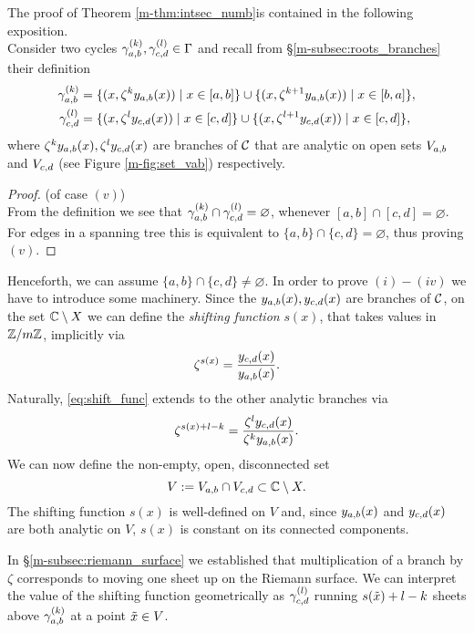 \documentclass[main.tex]{subfiles}
\begin{document}
 \bigskip
 The proof of Theorem \ref{m-thm:intsec_numb}is contained in the following exposition. \\ 
  Consider
  two cycles $\gamma_{a,b}^{(k)},\gamma_{c,d}^{(l)} \in \Gamma$ and
  recall from \S \ref{m-subsec:roots_branches} their definition 
   \begin{align*}
      \gamma_{a,b}^{(k)} & = \{  (x,\zeta^k y_{a,b}(x))  \mid  x \in [a,b]  \} \cup \{  (x,\zeta^{k+1} y_{a,b}(x))  \mid  x \in [b,a]  \}, \\
      \gamma_{c,d}^{(l)} & = \{  (x,\zeta^l y_{c,d}(x))  \mid  x \in [c,d]  \} \cup \{  (x,\zeta^{l+1} y_{c,d}(x))  \mid  x \in [c,d]  \},
   \end{align*}
  where $\zeta^ky_{a,b}(x),\zeta^ly_{c,d}(x)$ are branches of $\mathcal{C}$ that are analytic on open sets $V_{a,b}$ and $V_{c,d}$ 
  (see Figure \ref{m-fig:set_vab}) respectively.
  \begin{proof}\let\qed\relax (of case $(v)$) \\
  From the definition we see that $\gamma_{a,b}^{(k)} \cap \gamma_{c,d}^{(l)} = \varnothing$, whenever $[a,b] \cap [c,d] = \varnothing$. For edges in a spanning tree
  this is equivalent to $\{a,b\} \cap \{c,d\} = \varnothing$, thus
  proving $(v)$.
  \end{proof}
   Henceforth, we can assume $\{a,b\} \cap \{c,d\} \ne \varnothing$. In order to prove $(i)-(iv)$ we have to introduce some machinery. Since the $y_{a,b}(x),y_{c,d}(x)$ are branches of $\mathcal{C}$,
   on the set $\mathbb{C} \setminus X$
   we can define the \emph{shifting function}
   $s(x)$, that takes values in $\mathbb{Z}/m\mathbb{Z}$, implicitly via
  \begin{equation}\label{eq:shift_func}
   \zeta^{s(x)} = \frac{y_{c,d}(x)}{y_{a,b}(x)}.
   \end{equation}
  Naturally, \eqref{eq:shift_func} extends to the other analytic branches via
  \begin{equation*}
   \zeta^{s(x)+l-k} = \frac{\zeta^ly_{c,d}(x)}{\zeta^ky_{a,b}(x)}.
   \end{equation*}
   We can now define the non-empty, open, disconnected set
   \begin{equation*}
    V := V_{a,b} \cap V_{c,d} \subset \mathbb{C} \setminus X.
   \end{equation*}
 The shifting function $s(x)$ is well-defined on $V$ and, since $y_{a,b}(x)$ and $y_{c,d}(x)$ are 
  both analytic on $V$, $s(x)$ is constant on its 
  connected components.
  
  In \S \ref{m-subsec:riemann_surface} we established that multiplication of a branch by $\zeta$ corresponds to moving
  one sheet up on the Riemann surface.
  We can interpret the value of the shifting function geometrically as
  $\gamma_{c,d}^{(l)}$ running $s(\tilde{x})+l-k$ sheets above $\gamma_{a,b}^{(k)}$ at a point $\tilde{x} \in V$.
  
\end{document}

